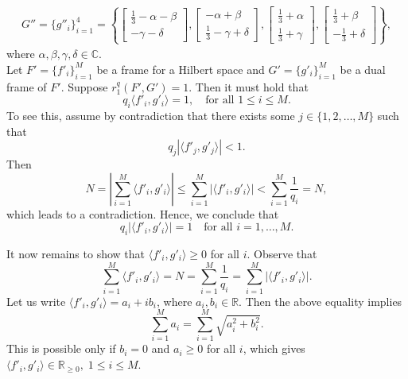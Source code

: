 \documentclass[final,1p,times]{elsarticle}
\begin{document}
\begin{align}
	G''= \{ g''_i \}_{i=1}^4 = \left\{ \begin{bmatrix} \frac{1}{3} - \alpha -\beta  \\ -\gamma - \delta \end{bmatrix}, \begin{bmatrix} -\alpha +\beta \\ \frac{1}{3} -\gamma +\delta  \end{bmatrix}, \begin{bmatrix} \frac{1}{3} + \alpha \\ \frac{1}{3} +\gamma  \end{bmatrix}, \begin{bmatrix} \frac{1}{3} +\beta\\ -\frac{1}{3} +\delta \end{bmatrix}  \right\},
	\end{align}
where $\alpha, \beta, \gamma, \delta \in \mathbb{C}.$\\

Let \( F' = \{f'_i\}_{i=1}^M \) be a frame for a Hilbert space and \( G' = \{g'_i\}_{i=1}^M \) be a dual frame of \( F' \). Suppose  \( r_1^q(F', G') = 1 \). Then it must hold that
\[
q_i \langle f'_i, g'_i \rangle = 1, \quad \text{for all } 1 \leq i \leq M.
\]
To see this, assume by contradiction that there exists some \( j \in \{1, 2, \dots, M\} \) such that
\[
q_j \left| \langle f'_j, g'_j \rangle \right| < 1.
\]
Then 
\[
N = \left| \sum_{i=1}^M \langle f'_i, g'_i \rangle \right| \leq \sum_{i=1}^M \left| \langle f'_i, g'_i \rangle \right| < \sum_{i=1}^M \frac{1}{q_i} = N,
\]
which leads to a contradiction. Hence, we conclude that
\[
q_i \left| \langle f'_i, g'_i \rangle \right| = 1 \quad \text{for all } i = 1, \dots, M.
\]

It now remains to show that \( \langle f'_i, g'_i \rangle \geq 0 \) for all \( i \). Observe that
\[
\sum_{i=1}^M \langle f'_i, g'_i \rangle = N = \sum_{i=1}^M \frac{1}{q_i} = \sum_{i=1}^M \left| \langle f'_i, g'_i \rangle \right|.
\]
Let us write \( \langle f'_i, g'_i \rangle = a_i + ib_i \), where \( a_i, b_i \in \mathbb{R} \). Then the above equality implies
\[
\sum_{i=1}^M a_i = \sum_{i=1}^M \sqrt{a_i^2 + b_i^2}.
\]
This is possible only if \( b_i = 0 \) and \( a_i \geq 0 \) for all \( i \), which gives \( \langle f'_i, g'_i \rangle \in \mathbb{R}_{\geq 0} ,\; 1\leq i \leq M\).
\end{document}
